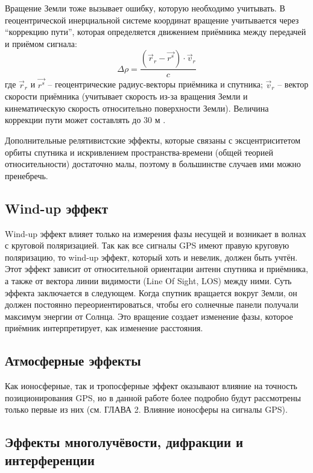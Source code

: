 Вращение Земли тоже вызывает ошибку, которую необходимо учитывать. 
В геоцентрической инерциальной системе координат вращение учитывается через ``коррекцию пути'', которая определяется движением приёмника между передачей и приёмом сигнала:
\begin{equation}
\Delta\rho=\frac{(\vec{r}_r-\vec{r^s})\cdot\vec{v}_r}{c}    
\end{equation}
где
$\vec{r}_r$ и $\vec{r^s}$ -- геоцентрические радиус-векторы приёмника и спутника;
$\vec{v}_r$ -- вектор скорости приёмника (учитывает скорость из-за вращения Земли и кинематическую скорость относительно поверхности Земли). 
Величина коррекции пути может составлять до 30 м \cite{Hecimovic2013}.  

Дополнительные релятивистские эффекты, которые связаны с эксцентриситетом орбиты спутника и искривлением пространства-времени (общей теорией относительности) достаточно малы, поэтому в большинстве случаев ими можно пренебречь. 

\subsection*{\textbf{Wind-up эффект}}

Wind-up эффект влияет только на измерения фазы несущей и возникает в волнах с круговой поляризацией.
Так как все сигналы GPS имеют правую круговую поляризацию, то wind-up эффект, который хоть и невелик, должен быть учтён. 
Этот эффект зависит от относительной ориентации антенн спутника и приёмника, а также от вектора линии видимости (Line Of Sight, LOS) между ними.
Суть эффекта заключается в следующем.
Когда спутник вращается вокруг Земли, он должен постоянно переориентироваться, чтобы его солнечные панели получали максимум энергии от Солнца.
Это вращение создает изменение фазы, которое приёмник интерпретирует, как изменение расстояния. 

\subsection*{\textbf{Атмосферные эффекты}}

Как ионосферные, так и тропосферные эффект оказывают влияние на точность позиционирования GPS, но в данной работе более подробно будут рассмотрены только первые из них (см. ГЛАВА 2. Влияние ионосферы на сигналы GPS). 

\subsection*{\textbf{Эффекты многолучёвости, дифракции и интерференции}}

